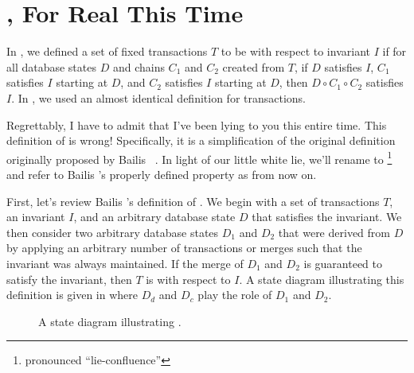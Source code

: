 \section{\iconfluence{}, For Real This Time}\label{sec:alie}
In , we defined a set of fixed transactions $T$ to be
\emph{\iconfluent{}} with respect to invariant $I$ if for all database states
$D$ and chains $C_1$ and $C_2$ created from $T$, if $D$ satisfies $I$, $C_1$
satisfies $I$ starting at $D$, and $C_2$ satisfies $I$ starting at $D$, then $D
\circ C_1 \circ C_2$ satisfies $I$. In , we used an almost
identical definition for \imp{} transactions.

Regrettably, I have to admit that I've been lying to you this entire time. This
definition of \iconfluence{} is wrong! Specifically, it is a simplification of
the original definition originally proposed by Bailis
\etal{}~\cite{bailis2014coordination}. In light of our little white lie, we'll
rename \iconfluence{} to \liconfluence{}\footnote{pronounced
``lie-confluence''} and refer to Bailis \etal's properly defined property as
\iconfluence{} from now on.

First, let's review Bailis \etal's definition of \iconfluence{}. We begin with
a set of transactions $T$, an invariant $I$, and an arbitrary database state
$D$ that satisfies the invariant. We then consider two arbitrary database
states $D_1$ and $D_2$ that were derived from $D$ by applying an arbitrary
number of transactions or merges such that the invariant was always maintained.
If the merge of $D_1$ and $D_2$ is guaranteed to satisfy the invariant, then
$T$ is \iconfluent{} with respect to $I$. A state diagram illustrating this
definition is given in  where $D_d$ and $D_c$ play
the role of $D_1$ and $D_2$.

\begin{figure}[h]
  \centering
  \caption{A state diagram illustrating \iconfluence{}.}
  \label{fig:iconfluence-example}
\end{figure}

